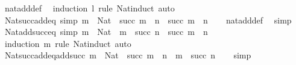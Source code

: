 \begin{isabellebody}
\ nat{\isacharunderscore}{\kern0pt}add{\isacharunderscore}{\kern0pt}def\ \isamarkupfalse%
\ {\isacharparenleft}{\kern0pt}induction\ l\ rule{\isacharcolon}{\kern0pt}\ Nat{\isacharunderscore}{\kern0pt}induct{\isacharparenright}{\kern0pt}\ auto%
\endisatagproof
{\isafoldproof}%
%
\isadelimproof
\isanewline
%
\endisadelimproof
\isanewline
{}\isamarkupfalse%
\ Nat{\isacharunderscore}{\kern0pt}succ{\isacharunderscore}{\kern0pt}add{\isacharunderscore}{\kern0pt}eq\ {\isacharbrackleft}{\kern0pt}simp{\isacharbrackright}{\kern0pt}{\isacharcolon}{\kern0pt}\ {\isachardoublequoteopen}m\ {\isacharcolon}{\kern0pt}\ Nat\ {\isasymLongrightarrow}\ succ\ m\ {\isacharplus}{\kern0pt}\ n\ {\isacharequal}{\kern0pt}\ succ\ {\isacharparenleft}{\kern0pt}m\ {\isacharplus}{\kern0pt}\ n{\isacharparenright}{\kern0pt}{\isachardoublequoteclose}\isanewline
%
\isadelimproof
\ \ %
\endisadelimproof
%
\isatagproof
{}\isamarkupfalse%
\ nat{\isacharunderscore}{\kern0pt}add{\isacharunderscore}{\kern0pt}def\ \isamarkupfalse%
\ simp%
\endisatagproof
{\isafoldproof}%
%
\isadelimproof
\isanewline
%
\endisadelimproof
\isanewline
{}\isamarkupfalse%
\ Nat{\isacharunderscore}{\kern0pt}add{\isacharunderscore}{\kern0pt}succ{\isacharunderscore}{\kern0pt}eq\ {\isacharbrackleft}{\kern0pt}simp{\isacharbrackright}{\kern0pt}{\isacharcolon}{\kern0pt}\ {\isachardoublequoteopen}m\ {\isacharcolon}{\kern0pt}\ Nat\ {\isasymLongrightarrow}\ m\ {\isacharplus}{\kern0pt}\ succ\ n\ {\isacharequal}{\kern0pt}\ succ\ {\isacharparenleft}{\kern0pt}m\ {\isacharplus}{\kern0pt}\ n{\isacharparenright}{\kern0pt}{\isachardoublequoteclose}\isanewline
%
\isadelimproof
\ \ %
\endisadelimproof
%
\isatagproof
{}\isamarkupfalse%
\ {\isacharparenleft}{\kern0pt}induction\ m\ rule{\isacharcolon}{\kern0pt}\ Nat{\isacharunderscore}{\kern0pt}induct{\isacharparenright}{\kern0pt}\ auto%
\endisatagproof
{\isafoldproof}%
%
\isadelimproof
\isanewline
%
\endisadelimproof
\isanewline
{}\isamarkupfalse%
\ Nat{\isacharunderscore}{\kern0pt}succ{\isacharunderscore}{\kern0pt}add{\isacharunderscore}{\kern0pt}eq{\isacharunderscore}{\kern0pt}add{\isacharunderscore}{\kern0pt}succ{\isacharcolon}{\kern0pt}\ {\isachardoublequoteopen}m\ {\isacharcolon}{\kern0pt}\ Nat\ {\isasymLongrightarrow}\ succ\ m\ {\isacharplus}{\kern0pt}\ n\ {\isacharequal}{\kern0pt}\ m\ {\isacharplus}{\kern0pt}\ succ\ n{\isachardoublequoteclose}\isanewline
%
\isadelimproof
\ \ %
\endisadelimproof
%
\isatagproof
{}\isamarkupfalse%
\ simp%
\endisatagproof
{\isafoldproof}%

\end{isabellebody}
